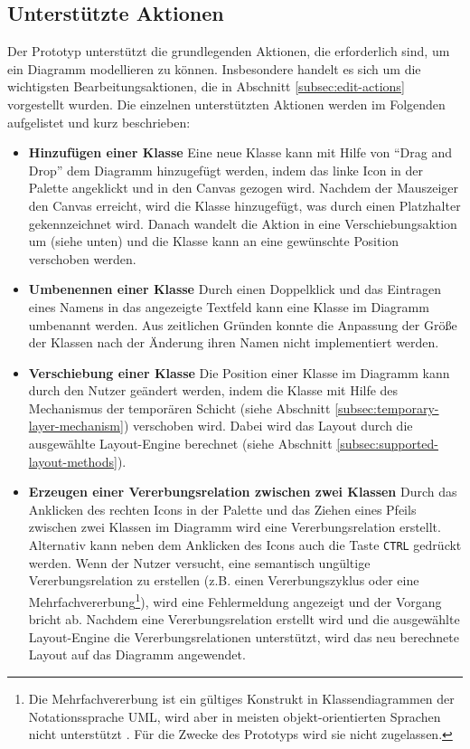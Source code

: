 \subsection{Unterstützte Aktionen}
\label{subsec:supported-actions}

Der Prototyp unterstützt die grundlegenden Aktionen, die erforderlich sind, um ein Diagramm modellieren zu können. Insbesondere handelt es sich um die wichtigsten Bearbeitungsaktionen, die in Abschnitt \ref{subsec:edit-actions} vorgestellt wurden. Die einzelnen unterstützten Aktionen werden im Folgenden aufgelistet und kurz beschrieben:

\begin{itemize}

\item
\textbf{Hinzufügen einer Klasse}
Eine neue Klasse kann mit Hilfe von \enquote{Drag and Drop} dem Diagramm hinzugefügt werden, indem das linke Icon in der Palette angeklickt und in den Canvas gezogen wird. Nachdem der Mauszeiger den Canvas erreicht, wird die Klasse hinzugefügt, was durch einen Platzhalter gekennzeichnet wird. Danach wandelt die Aktion in eine Verschiebungsaktion um (siehe unten) und die Klasse kann an eine gewünschte Position verschoben werden.

\item
\textbf{Umbenennen einer Klasse}
Durch einen Doppelklick und das Eintragen eines Namens in das angezeigte Textfeld kann eine Klasse im Diagramm umbenannt werden. Aus zeitlichen Gründen konnte die Anpassung der Größe der Klassen nach der Änderung ihren Namen nicht implementiert werden.

\item
\textbf{Verschiebung einer Klasse}
Die Position einer Klasse im Diagramm kann durch den Nutzer geändert werden, indem die Klasse mit Hilfe des Mechanismus der temporären Schicht (siehe Abschnitt \ref{subsec:temporary-layer-mechanism}) verschoben wird. Dabei wird das Layout durch die ausgewählte Layout-Engine berechnet (siehe Abschnitt \ref{subsec:supported-layout-methods}).

\item
\textbf{Erzeugen einer Vererbungsrelation zwischen zwei Klassen}
Durch das Anklicken des rechten Icons in der Palette und das Ziehen eines Pfeils zwischen zwei Klassen im Diagramm wird eine Vererbungsrelation erstellt. Alternativ kann neben dem Anklicken des Icons auch die Taste \texttt{CTRL} gedrückt werden. Wenn der Nutzer versucht, eine semantisch ungültige Vererbungsrelation zu erstellen (z.B. einen Vererbungszyklus oder eine Mehrfachvererbung\footnote{Die Mehrfachvererbung ist ein gültiges Konstrukt in Klassendiagrammen der Notationssprache UML, wird aber in meisten objekt-orientierten Sprachen nicht unterstützt \cite{ArlowNeustadt05UML-2-and-the-Unified}. Für die Zwecke des Prototyps wird sie nicht zugelassen.}), wird eine Fehlermeldung angezeigt und der Vorgang bricht ab. Nachdem eine Vererbungsrelation erstellt wird und die ausgewählte Layout-Engine die Vererbungsrelationen unterstützt, wird das neu berechnete Layout auf das Diagramm angewendet.


\end{itemize}
